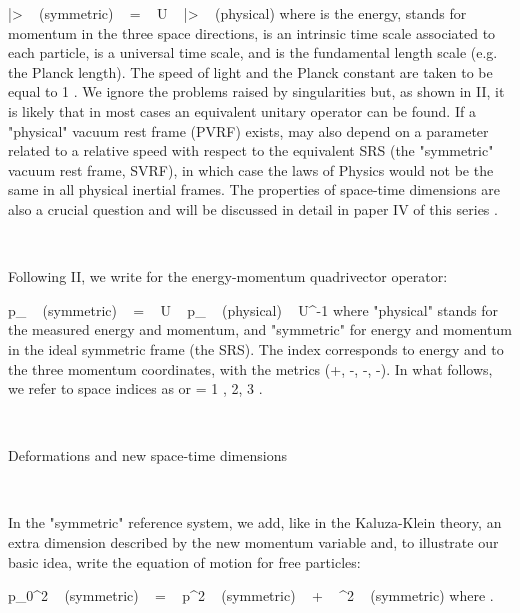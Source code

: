 \documentclass[a4paper,12pt,dvips]{article}
\makeatletter
\renewcommand{\section}{\@startsection{section}{1}{0in}
	{0.4\baselineskip}{0.1\baselineskip}{\Large\bf}}
\makeatother
\begin{document}
\equation
|\psi> ~ (symmetric) ~ = ~ U ~ |\psi> ~ (physical)
\endequation
\noindent
where \coordHE{} is the energy, \coordHE{} stands for momentum in the three space directions, \coordHE{} is an intrinsic time scale associated to each particle, \coordHE{} is a universal time scale, and \coordHE{} is the fundamental length scale (e.g. the Planck length). The speed of light \coordHE{} and the Planck constant are taken to be equal to 1 . We ignore the problems raised by singularities but, as shown in II, it is likely that in most cases an equivalent unitary operator \coordHE{} can be found. If a "physical" vacuum rest frame (PVRF) exists, \coordHE{} may also depend on a parameter related to a relative speed with respect to the equivalent SRS (the "symmetric" vacuum rest frame, SVRF), in which case the laws of Physics would not be the same in all physical inertial frames. The properties of space-time dimensions are also a crucial question and will be discussed in detail in paper IV of this series .

~

Following II, we write for the energy-momentum quadrivector operator:

\equation
p_{\alpha} ~ (symmetric) ~ = ~ U ~ p_{\alpha} ~ (physical) ~ U^{-1}
\endequation
\noindent
where "physical" stands for the measured energy and momentum, and "symmetric" for energy and momentum in the ideal symmetric frame (the SRS). The index \coordHE{} corresponds to energy and to the three momentum coordinates, with the metrics (+, -, -, -). In what follows, we refer to space indices as \coordHE{} or \coordHE{} = 1 , 2, 3 .

~
~ 

\section{Deformations and new space-time dimensions}
\label{deformation.sec}

~

In the "symmetric" reference system, we add, like in the Kaluza-Klein theory, an extra dimension described by the new momentum variable \myHighlight{$\sigma $}\coordHE{} and, to illustrate our basic idea, write the equation of motion for free particles:

\equation
p_{0}^2 ~ (symmetric) ~ = ~ p^2 ~ (symmetric) ~ + ~ \sigma ^2 ~ (symmetric)
\endequation
\noindent
where \coordHE{} .
\end{document}
